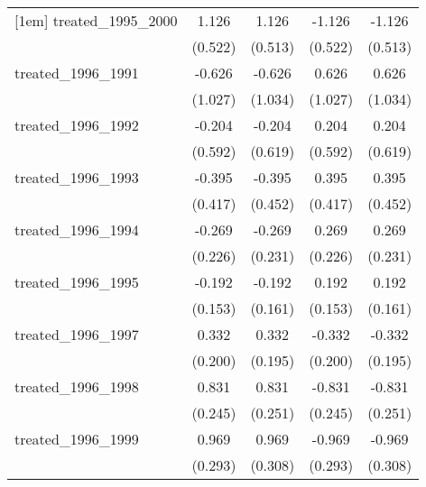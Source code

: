 {\begin{tabular}{l*{4}{c}}
[1em]
treated\_1995\_2000&       1.126\sym{*}  &       1.126\sym{*}  &      -1.126\sym{*}  &      -1.126\sym{*}  \\
            &     (0.522)         &     (0.513)         &     (0.522)         &     (0.513)         \\
[1em]
treated\_1996\_1991&      -0.626         &      -0.626         &       0.626         &       0.626         \\
            &     (1.027)         &     (1.034)         &     (1.027)         &     (1.034)         \\
[1em]
treated\_1996\_1992&      -0.204         &      -0.204         &       0.204         &       0.204         \\
            &     (0.592)         &     (0.619)         &     (0.592)         &     (0.619)         \\
[1em]
treated\_1996\_1993&      -0.395         &      -0.395         &       0.395         &       0.395         \\
            &     (0.417)         &     (0.452)         &     (0.417)         &     (0.452)         \\
[1em]
treated\_1996\_1994&      -0.269         &      -0.269         &       0.269         &       0.269         \\
            &     (0.226)         &     (0.231)         &     (0.226)         &     (0.231)         \\
[1em]
treated\_1996\_1995&      -0.192         &      -0.192         &       0.192         &       0.192         \\
            &     (0.153)         &     (0.161)         &     (0.153)         &     (0.161)         \\
[1em]
treated\_1996\_1997&       0.332         &       0.332         &      -0.332         &      -0.332         \\
            &     (0.200)         &     (0.195)         &     (0.200)         &     (0.195)         \\
[1em]
treated\_1996\_1998&       0.831\sym{***}&       0.831\sym{***}&      -0.831\sym{***}&      -0.831\sym{***}\\
            &     (0.245)         &     (0.251)         &     (0.245)         &     (0.251)         \\
[1em]
treated\_1996\_1999&       0.969\sym{***}&       0.969\sym{**} &      -0.969\sym{***}&      -0.969\sym{**} \\
            &     (0.293)         &     (0.308)         &     (0.293)         &     (0.308)         \\

\end{tabular}}
